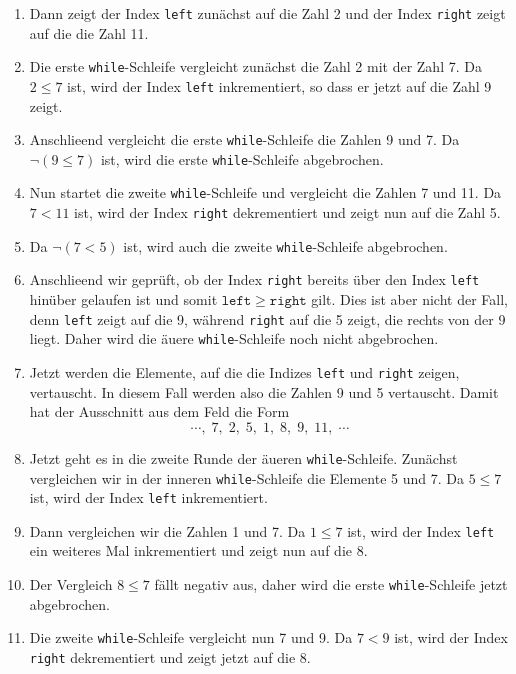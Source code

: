 \begin{enumerate}
\item Dann zeigt der Index \texttt{left} zun\"achst auf
      die Zahl 2 und der Index \texttt{right} zeigt auf die die Zahl 11.
\item Die erste \texttt{while}-Schleife vergleicht zun\"achst die Zahl 2 mit der Zahl 7.
      Da $2 \leq 7$ ist, wird der Index \texttt{left} inkrementiert, so dass er jetzt auf 
      die Zahl 9 zeigt.
\item Anschlie\3end vergleicht die  erste \texttt{while}-Schleife die Zahlen 9 und 7.
      Da $\neg(9 \leq 7)$ ist, wird die erste \texttt{while}-Schleife abgebrochen.
\item Nun startet die zweite \texttt{while}-Schleife und vergleicht die Zahlen 7 und 11.
      Da $7 < 11$ ist, wird der Index \texttt{right} dekrementiert und zeigt nun auf die
      Zahl 5.
\item Da $\neg (7 < 5)$ ist, wird auch die zweite \texttt{while}-Schleife abgebrochen.
\item Anschlie\3end wir gepr\"uft, ob der Index \texttt{right} bereits \"uber den Index
      \texttt{left} hin\"uber gelaufen ist und somit $\mathtt{left} \geq \mathtt{right}$
      gilt.   Dies ist aber nicht der Fall, denn \texttt{left} zeigt auf die 9,
      w\"ahrend \texttt{right} auf die 5 zeigt, die rechts von der 9 liegt.
      Daher wird die \"au\3ere \texttt{while}-Schleife noch nicht abgebrochen.
\item Jetzt werden die Elemente, auf die die Indizes \texttt{left} und \texttt{right}
      zeigen, vertauscht.  In diesem Fall werden also die Zahlen 9 und 5 vertauscht.
      Damit hat der Ausschnitt aus dem Feld die Form
      \[ \cdots,\; 7,\; 2,\; 5,\; 1,\; 8,\; 9,\; 11,\;\cdots \]
\item Jetzt geht es in die zweite Runde der \"au\3eren \texttt{while}-Schleife.
      Zun\"achst vergleichen wir in der inneren \texttt{while}-Schleife die Elemente
      5 und 7.  Da $5 \leq 7$ ist, wird der Index \texttt{left} inkrementiert.
\item Dann vergleichen wir die Zahlen 1 und 7.  Da $1 \leq 7$ ist, wird der Index
      \texttt{left} ein weiteres Mal inkrementiert und zeigt nun auf die 8.
\item Der Vergleich $8 \leq 7$ f\"allt negativ aus, daher wird die erste
      \texttt{while}-Schleife jetzt abgebrochen.
\item Die zweite \texttt{while}-Schleife vergleicht nun 7 und 9.  Da $7 < 9$ ist,
      wird der Index \texttt{right} dekrementiert und zeigt jetzt auf die 8.

\end{enumerate}
